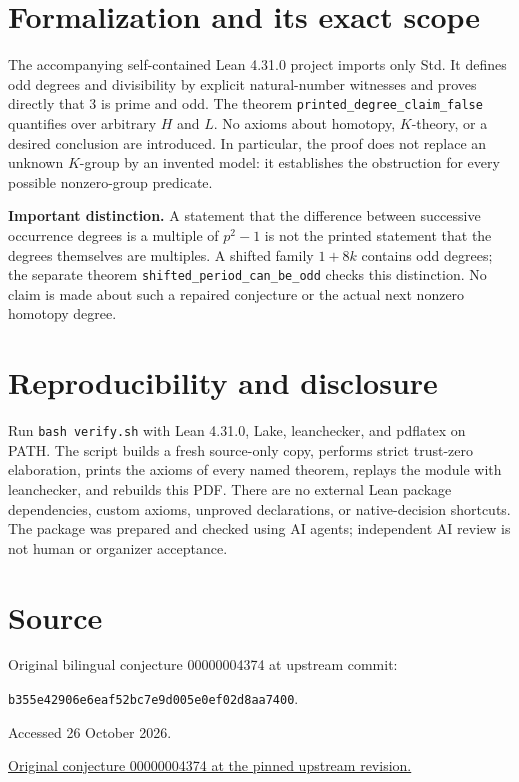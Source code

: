 \documentclass[11pt]{article}
\begin{document}
\section{Formalization and its exact scope}
The accompanying self-contained Lean 4.31.0 project imports only Std. It defines odd degrees and divisibility by explicit natural-number witnesses and proves directly that $3$ is prime and odd. The theorem \texttt{printed\_degree\_claim\_false} quantifies over arbitrary $H$ and $L$. No axioms about homotopy, $K$-theory, or a desired conclusion are introduced. In particular, the proof does not replace an unknown $K$-group by an invented model: it establishes the obstruction for every possible nonzero-group predicate.

\textbf{Important distinction.} A statement that the difference between successive occurrence degrees is a multiple of $p^2-1$ is not the printed statement that the degrees themselves are multiples. A shifted family $1+8k$ contains odd degrees; the separate theorem \texttt{shifted\_period\_can\_be\_odd} checks this distinction. No claim is made about such a repaired conjecture or the actual next nonzero homotopy degree.

\section{Reproducibility and disclosure}
Run \texttt{bash verify.sh} with Lean 4.31.0, Lake, leanchecker, and pdflatex on PATH. The script builds a fresh source-only copy, performs strict trust-zero elaboration, prints the axioms of every named theorem, replays the module with leanchecker, and rebuilds this PDF. There are no external Lean package dependencies, custom axioms, unproved declarations, or native-decision shortcuts. The package was prepared and checked using AI agents; independent AI review is not human or organizer acceptance.

\section{Source}
Original bilingual conjecture 00000004374 at upstream commit:\par
\noindent\texttt{b355e42906e6eaf52bc7e9d005e0ef02d8aa7400}.\par
\noindent Accessed 26 October 2026.\par
\href{https://github.com/The-Last-Math-Competition/The-Last-Math-Competition/blob/b355e42906e6eaf52bc7e9d005e0ef02d8aa7400/conjectures/00000004374.md}{Original conjecture 00000004374 at the pinned upstream revision.}
\end{document}
